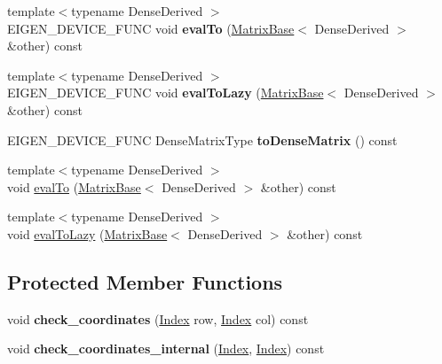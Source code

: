 \begin{DoxyCompactItemize}
\item 
\mbox{\label{class_eigen_1_1_triangular_base_a829eee4c087fa168426d183a8ea7ae23}} 
{\footnotesize template$<$typename Dense\+Derived $>$ }\\E\+I\+G\+E\+N\+\_\+\+D\+E\+V\+I\+C\+E\+\_\+\+F\+U\+NC void {\bfseries eval\+To} (\mbox{\hyperlink{class_eigen_1_1_matrix_base}{Matrix\+Base}}$<$ Dense\+Derived $>$ \&other) const
\item 
\mbox{\label{class_eigen_1_1_triangular_base_ad05367709c25defe72371a9fa83b9697}} 
{\footnotesize template$<$typename Dense\+Derived $>$ }\\E\+I\+G\+E\+N\+\_\+\+D\+E\+V\+I\+C\+E\+\_\+\+F\+U\+NC void {\bfseries eval\+To\+Lazy} (\mbox{\hyperlink{class_eigen_1_1_matrix_base}{Matrix\+Base}}$<$ Dense\+Derived $>$ \&other) const
\item 
\mbox{\label{class_eigen_1_1_triangular_base_aa57795da6154a0fca8b9acb9de7a5497}} 
E\+I\+G\+E\+N\+\_\+\+D\+E\+V\+I\+C\+E\+\_\+\+F\+U\+NC Dense\+Matrix\+Type {\bfseries to\+Dense\+Matrix} () const
\item 
{\footnotesize template$<$typename Dense\+Derived $>$ }\\void \mbox{\hyperlink{class_eigen_1_1_triangular_base_a604d4f76a376ced36f8b9c3374c76c3e}{eval\+To}} (\mbox{\hyperlink{class_eigen_1_1_matrix_base}{Matrix\+Base}}$<$ Dense\+Derived $>$ \&other) const
\item 
{\footnotesize template$<$typename Dense\+Derived $>$ }\\void \mbox{\hyperlink{class_eigen_1_1_triangular_base_ab8db3e55eee50cdc56650b3498e235eb}{eval\+To\+Lazy}} (\mbox{\hyperlink{class_eigen_1_1_matrix_base}{Matrix\+Base}}$<$ Dense\+Derived $>$ \&other) const
\end{DoxyCompactItemize}
\subsection*{Protected Member Functions}
\begin{DoxyCompactItemize}
\item 
\mbox{\label{class_eigen_1_1_triangular_base_ac40fdb0c6fcf5b83e3122ae463ffb6f4}} 
void {\bfseries check\+\_\+coordinates} (\mbox{\hyperlink{struct_eigen_1_1_eigen_base_a554f30542cc2316add4b1ea0a492ff02}{Index}} row, \mbox{\hyperlink{struct_eigen_1_1_eigen_base_a554f30542cc2316add4b1ea0a492ff02}{Index}} col) const
\item 
\mbox{\label{class_eigen_1_1_triangular_base_ac12b1321e5d40095b532d57acb795b29}} 
void {\bfseries check\+\_\+coordinates\+\_\+internal} (\mbox{\hyperlink{struct_eigen_1_1_eigen_base_a554f30542cc2316add4b1ea0a492ff02}{Index}}, \mbox{\hyperlink{struct_eigen_1_1_eigen_base_a554f30542cc2316add4b1ea0a492ff02}{Index}}) const
\end{DoxyCompactItemize}



